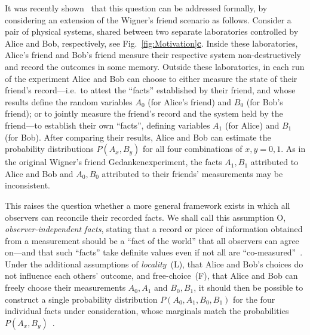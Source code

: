 \documentclass[aps,floatfix,superscriptaddress,twocolumn,tightenlines,amsmath,amssymb,nofootinbib,10pt]{revtex4-1}
\begin{document}
It was recently shown~\cite{Brukner2018} that this question can be addressed formally, by considering an extension of the Wigner's friend scenario as follows. Consider a pair of physical systems, shared between two separate laboratories controlled by Alice and Bob, respectively, see Fig.~\hyperref[fig:Motivation]{\ref*{fig:Motivation}\textbf{c}}. Inside these laboratories, Alice's friend and Bob's friend measure their respective system non-destructively and record the outcomes in some memory. Outside these laboratories, in each run of the experiment Alice and Bob can choose to either measure the state of their friend's record---i.e.\ to attest the ``facts'' established by their friend, and whose results define the random variables $A_0$ (for Alice's friend) and $B_0$ (for Bob's friend); or to jointly measure the friend's record and the system held by the friend---to establish their own ``facts'', defining variables $A_1$ (for Alice) and $B_1$ (for Bob). After comparing their results, Alice and Bob can estimate the probability distributions $P(A_x,B_y)$ for all four combinations of $x,y = 0,1$. As in the original Wigner's friend Gedankenexperiment, the facts $A_1, B_1$ attributed to Alice and Bob and $A_0, B_0$ attributed to their friends' measurements may be inconsistent.

This raises the question whether a more general framework exists in which all observers can reconcile their recorded facts. We shall call this assumption O, \emph{observer-independent facts}, stating that a record or piece of information obtained from a measurement should be a ``fact of the world'' that all observers can agree on---and that such ``facts'' take definite values even if not all are ``co-measured''~\cite{Healey2019,Brukner2019}. Under the additional assumptions of \emph{locality}~(L), that Alice and Bob's choices do not influence each others' outcome, and free-choice~(F), that Alice and Bob can freely choose their measurements $A_0, A_1$ and $B_0, B_1$, it should then be possible to construct a single probability distribution $P(A_0,A_1,B_0,B_1)$ for the four individual facts under consideration, whose marginals match the probabilities $P(A_x,B_y)$~\cite{Brukner2015MeasurementProblem,Brukner2018}.
\end{document}
